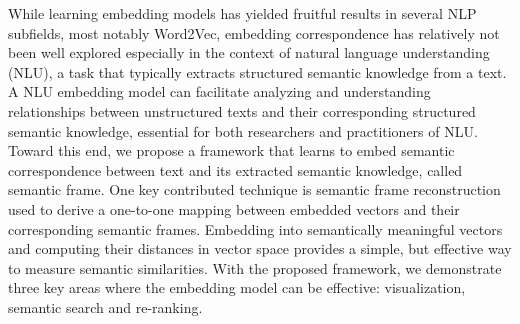 While learning embedding models has yielded fruitful results in several NLP subfields, most notably Word2Vec, embedding correspondence has relatively not been well explored especially in the context of natural language understanding (NLU), a task that typically extracts structured semantic knowledge from a text. A NLU embedding model can facilitate analyzing and understanding relationships between unstructured texts and their corresponding structured semantic knowledge, essential for both researchers and practitioners of NLU. Toward this end, we propose a framework that learns to embed semantic correspondence between text and its extracted semantic knowledge, called semantic frame. One key contributed technique is semantic frame reconstruction used to derive a one-to-one mapping between embedded vectors and their corresponding semantic frames. Embedding into semantically meaningful vectors and computing their distances in vector space provides a simple, but effective way to measure semantic similarities. With the proposed framework, we demonstrate three key areas where the embedding model can be effective: visualization, semantic search and re-ranking.
